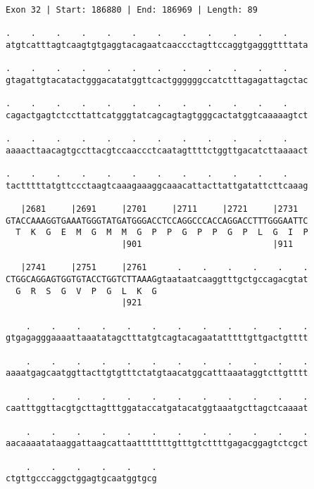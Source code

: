 \documentclass{article}
\begin{document}
\newpage
\begin{Verbatim}
Exon 32 | Start: 186880 | End: 186969 | Length: 89
 
.    .    .    .    .    .    .    .    .    .    .    .    
atgtcatttagtcaagtgtgaggtacagaatcaaccctagttccaggtgagggttttata
  
.    .    .    .    .    .    .    .    .    .    .    .    
gtagattgtacatactgggacatatggttcactggggggccatctttagagattagctac
  
.    .    .    .    .    .    .    .    .    .    .    .    
cagactgagtctccttattcatgggtatcagcagtagtgggcactatggtcaaaaagtct
  
.    .    .    .    .    .    .    .    .    .    .    .    
aaaacttaacagtgccttacgtccaaccctcaatagttttctggttgacatcttaaaact
  
.    .    .    .    .    .    .    .    .    .    .    .    
tactttttatgttccctaagtcaaagaaaggcaaacattacttattgatattcttcaaag
  
   |2681     |2691     |2701     |2711     |2721     |2731  
GTACCAAAGGTGAAATGGGTATGATGGGACCTCCAGGCCCACCAGGACCTTTGGGAATTC
  T  K  G  E  M  G  M  M  G  P  P  G  P  P  G  P  L  G  I  P
                       |901                          |911   
  
   |2741     |2751     |2761      .    .    .    .    .    .
CTGGCAGGAGTGGTGTACCTGGTCTTAAAGgtaataatcaaggtttgctgccagacgtat
  G  R  S  G  V  P  G  L  K  G                              
                       |921                                 
  
    .    .    .    .    .    .    .    .    .    .    .    .
gtgagagggaaaattaaatatagctttatgtcagtacagaatatttttgttgactgtttt
  
    .    .    .    .    .    .    .    .    .    .    .    .
aaaatgagcaatggttacttgtgtttctatgtaacatggcatttaaataggtcttgtttt
  
    .    .    .    .    .    .    .    .    .    .    .    .
caatttggttacgtgcttagtttggataccatgatacatggtaaatgcttagctcaaaat
  
    .    .    .    .    .    .    .    .    .    .    .    .
aacaaaatataaggattaagcattaatttttttgtttgtcttttgagacggagtctcgct
  
    .    .    .    .    .    .
ctgttgcccaggctggagtgcaatggtgcg
\end{Verbatim}
\newpage
\end{document}
